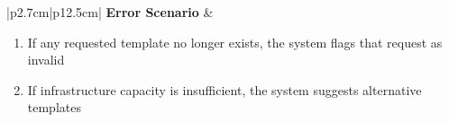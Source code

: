 \begin{table}[H]
\begin{tabular}{|p{2.7cm}|p{12.5cm}|}
        \hline
        \textbf{Error Scenario} & \begin{minipage}[t]{\linewidth}
                                      \begin{enumerate}[topsep=0pt,itemsep=1pt,parsep=0pt,partopsep=0pt]
                                          \item If any requested template no longer exists, the system flags that request as
                                                invalid
                                          \item If infrastructure capacity is insufficient, the system suggests alternative
                                                templates
                                      \end{enumerate}
                                  \end{minipage}  \\
        \hline
    \end{tabular}
    \label{tab:admin-approve-vm-assignments}
\end{table}
